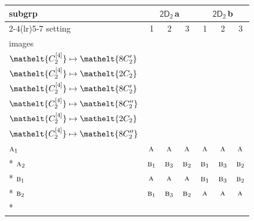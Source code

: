 \documentclass[10pt,a4paper]{article}
\numberwithin{equation}{section}
\newcommand{\eltfont}[1]{{\let\sigma\eltsigma\mathelt{#1}}}
\newcommand{\grp}[1]{\mathsf{#1}}
\newcommand{\irr}[1]{\text{\normalfont\scshape #1}}
\newcommand{\cls}[1]{\eltfont{#1}}
\newcommand{\clsletter}[1]{\,{\scriptsize\color{black!55}#1}}
\newcommand{\genidx}[2]{#1^{[\mathrm{#2}]}}
\begin{document}
{\small\begin{longtable}{@{}lcccccc@{}}\toprule
subgrp & \multicolumn{3}{c}{\href{2D2.pdf}{$\grp{2D_{2}}$}\clsletter{a}} & \multicolumn{3}{c}{\href{2D2.pdf}{$\grp{2D_{2}}$}\clsletter{b}}\\\cmidrule(lr){2-4}\cmidrule(lr){5-7}
setting & 1 & 2 & 3 & 1 & 2 & 3\\
images & {\scriptsize\begin{tabular}[t]{@{}c@{}}$\cls{\genidx{C_{2}}{2}} \mapsto \cls{2C_{2}}$\\$\cls{\genidx{C_{2}}{4}} \mapsto \cls{8C_{2}'}$\end{tabular}} & {\scriptsize\begin{tabular}[t]{@{}c@{}}$\cls{\genidx{C_{2}}{2}} \mapsto \cls{8C_{2}'}$\\$\cls{\genidx{C_{2}}{4}} \mapsto \cls{2C_{2}}$\end{tabular}} & {\scriptsize\begin{tabular}[t]{@{}c@{}}$\cls{\genidx{C_{2}}{2}} \mapsto \cls{8C_{2}'}$\\$\cls{\genidx{C_{2}}{4}} \mapsto \cls{8C_{2}'}$\end{tabular}} & {\scriptsize\begin{tabular}[t]{@{}c@{}}$\cls{\genidx{C_{2}}{2}} \mapsto \cls{2C_{2}}$\\$\cls{\genidx{C_{2}}{4}} \mapsto \cls{8C_{2}''}$\end{tabular}} & {\scriptsize\begin{tabular}[t]{@{}c@{}}$\cls{\genidx{C_{2}}{2}} \mapsto \cls{8C_{2}''}$\\$\cls{\genidx{C_{2}}{4}} \mapsto \cls{2C_{2}}$\end{tabular}} & {\scriptsize\begin{tabular}[t]{@{}c@{}}$\cls{\genidx{C_{2}}{2}} \mapsto \cls{8C_{2}''}$\\$\cls{\genidx{C_{2}}{4}} \mapsto \cls{8C_{2}''}$\end{tabular}}\\\midrule\endhead
\bottomrule\endfoot\endlastfoot
$\irr{a}_{1}$ & $\irr{a}$ & $\irr{a}$ & $\irr{a}$ & $\irr{a}$ & $\irr{a}$ & $\irr{a}$\\*
$\irr{a}_{2}$ & $\irr{b}_{1}$ & $\irr{b}_{3}$ & $\irr{b}_{2}$ & $\irr{b}_{1}$ & $\irr{b}_{3}$ & $\irr{b}_{2}$\\*
$\irr{b}_{1}$ & $\irr{a}$ & $\irr{a}$ & $\irr{a}$ & $\irr{b}_{1}$ & $\irr{b}_{3}$ & $\irr{b}_{2}$\\*
$\irr{b}_{2}$ & $\irr{b}_{1}$ & $\irr{b}_{3}$ & $\irr{b}_{2}$ & $\irr{a}$ & $\irr{a}$ & $\irr{a}$\\*

\end{longtable}}
\end{document}
